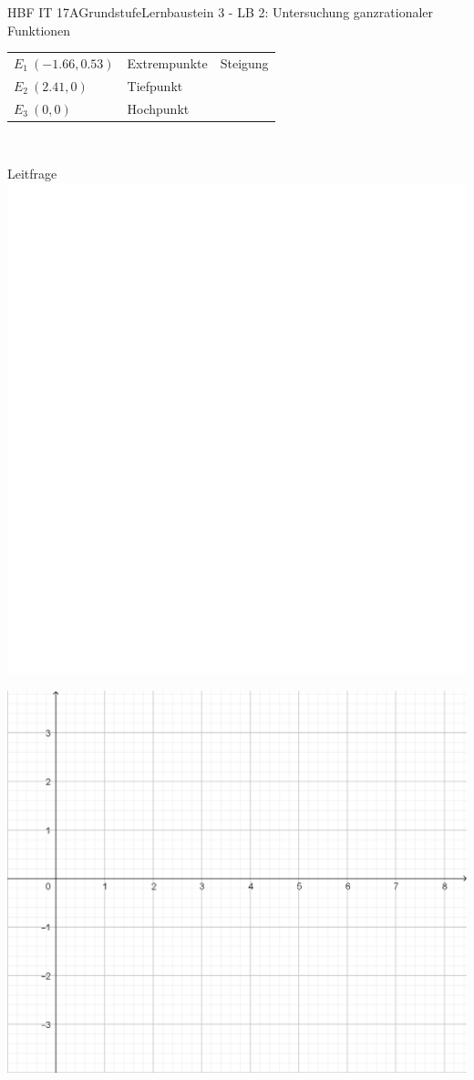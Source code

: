 \documentclass[oneside,openany,headings=optiontotoc,11pt,numbers=noenddot]{scrreprt}
\begin{document}
\begin{worksheet}{HBF IT 17A}{Grundstufe}{Lernbaustein 3 - LB 2: Untersuchung ganzrationaler Funktionen}
		\begin{framed}
			\noindent
			\begin{tabularx}{\textwidth}{XXX}
				\(E_1\ (-1.66,0.53)\) & Extrempunkte & Steigung\\
				\(E_2\ (2.41,0)\) & Tiefpunkt & \\
				\(E_3\ (0,0)\) & Hochpunkt\\
				\hline
			\end{tabularx}\\
			\par\noindent
			\tiny{\color{codegray}Leitfrage}\\
			\includegraphics[scale=0.15]{../empty.jpg}
		\end{framed}
		\newpage
		\begin{framed}
			\noindent
			\centering
			\includegraphics[scale=0.6]{Bilder/Koord_g.png}

\end{framed}
\end{worksheet}
\end{document}
